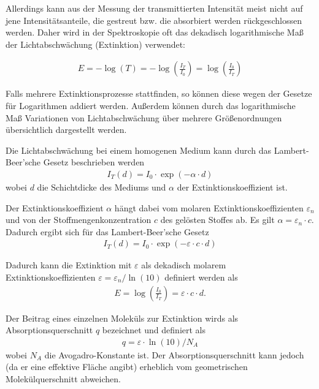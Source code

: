 \documentclass{article}
\begin{document}
Allerdings kann aus der Messung der transmittierten Intensität meist nicht auf jene Intensitätsanteile, die gestreut bzw. die absorbiert werden rückgeschlossen werden. Daher wird in der Spektroskopie oft das dekadisch logarithmische Maß der Lichtabschwächung (Extinktion) verwendet:

\begin{align}
\label{eq:ex}
E = -\log(T) = -\log\left(\frac{I_T}{I_0}\right) = \log\left(\frac{I_0}{I_T}\right)
\end{align}

Falls mehrere Extinktionsprozesse stattfinden, so können diese wegen der Gesetze für Logarithmen addiert werden. Außerdem können durch das logarithmische Maß Variationen von Lichtabschwächung über mehrere Größenordnungen übersichtlich dargestellt werden.

Die Lichtabschwächung bei einem homogenen Medium kann durch das Lambert-Beer'sche Gesetz beschrieben werden
\begin{align}
I_T(d) = I_0 \cdot \exp\left(-\alpha\cdot d\right)
\end{align}
wobei $d$ die Schichtdicke des Mediums und $\alpha$ der Extinktionskoeffizient ist.

Der Extinktionskoeffizient $\alpha$ hängt dabei vom molaren Extinktionskoeffizienten $\varepsilon_n$ und von der Stoffmengenkonzentration $c$ des gelösten Stoffes ab. Es gilt $\alpha = \varepsilon_n \cdot c$. Dadurch ergibt sich für das Lambert-Beer'sche Gesetz
\begin{align}
I_T(d) = I_0 \cdot \exp\left(-\varepsilon\cdot c\cdot d\right)
\end{align}

Dadurch kann die Extinktion mit $\varepsilon$ als dekadisch molarem Extinktionskoeffizienten $\varepsilon = \varepsilon_n / \operatorname{ln}(10)$ definiert werden als
\begin{align}
\label{eq:konzentration}
E = \log\left(\frac{I_0}{I_T}\right) = \varepsilon\cdot c\cdot d.
\end{align}

Der Beitrag eines einzelnen Moleküls zur Extinktion wirds als Absorptionsquerschnitt $q$ bezeichnet und definiert als
\begin{align}
q = \varepsilon\cdot \operatorname{ln}(10) / N_A
\end{align}
wobei $N_A$ die Avogadro-Konstante ist. Der Absorptionsquerschnitt kann jedoch (da er eine effektive Fläche angibt) erheblich vom geometrischen Molekülquerschnitt abweichen.
\end{document}

